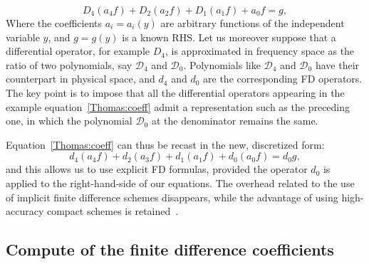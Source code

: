 \begin{equation}
D_{4}(a_{4}f) + D_{2}(a_{2}f)+D_{1}(a_{1}f)+a_{0}f = g,
\label{Thomas:coeff}
\end{equation}
Where the coefficients $a_{i}= a_{i}(y)$ are arbitrary functions of the independent variable $y$, and $g = g(y)$ is a known RHS. Let us moreover suppose that a differential operator, for example $D_{4}$, is approximated in frequency space as the ratio of two polynomials, say $\mathcal{D}_{4}$ and $\mathcal{D}_{0}$. Polynomials like $\mathcal{D}_{4}$ and $\mathcal{D}_{0}$ have their counterpart in physical space, and ${d}_{4}$ and $d_{0}$ are the corresponding FD operators. The key point is to impose that all the differential operators appearing in the example equation~\ref{Thomas:coeff} admit a representation such as the preceding one, in which the polynomial $\mathcal{D}_{0}$ at the denominator remains the same.\par
Equation~\ref{Thomas:coeff} can thus be recast in the new, discretized form:
\begin{equation}
d_{4} (a_{4}f) + d_{2} (a_{3}f) + d_{1} (a_{1}f) + d_{0} (a_{0}f) = d_{0} g,
\end{equation}
and this allows us to use explicit FD formulas, provided the operator $d_{0}$ is applied to the right-hand-side of our equations. The overhead related to the use of implicit finite difference schemes disappears, while the advantage of using high-accuracy compact schemes is retained~\cite{ns:quadrio}.





\subsection{Compute of the finite difference coefficients}





